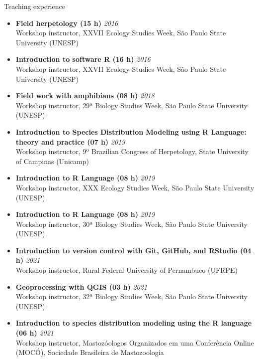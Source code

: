 \documentclass{resume}
\begin{document}
\begin{rSection}{Teaching experience}
\begin{itemize}
\item \textbf{Field herpetology (15 h)} \hfill{\em 2016}\\
Workshop instructor, XXVII Ecology Studies Week, São Paulo State University (UNESP) 

\item \textbf{Introduction to software R (16 h)} \hfill{\em 2016}\\
Workshop instructor, XXVII Ecology Studies Week, São Paulo State University (UNESP) 

\item \textbf{Field work with amphibians (08 h)} \hfill{\em 2018}\\
Workshop instructor, 29ª Biology Studies Week, São Paulo State University (UNESP) 

\item \textbf{Introduction to Species Distribution Modeling using R Language: theory and practice (07 h)} \hfill{\em 2019}\\
Workshop instructor, 9º Brazilian Congress of Herpetology, State University of Campinas (Unicamp)

\item \textbf{Introduction to R Language (08 h)} \hfill{\em 2019}\\
Workshop instructor, XXX Ecology Studies Week, São Paulo State University (UNESP) 

\item \textbf{Introduction to R Language (08 h)} \hfill{\em 2019}\\
Workshop instructor, 30ª Biology Studies Week, São Paulo State University (UNESP)

\item \textbf{Introduction to version control with Git, GitHub, and RStudio (04 h)} \hfill{\em 2021}\\
Workshop instructor, Rural Federal University of Pernambuco (UFRPE)

\item \textbf{Geoprocessing with QGIS (03 h)} \hfill{\em 2021}\\
Workshop instructor, 32ª Biology Studies Week, São Paulo State University (UNESP)

\item \textbf{Introduction to species distribution modeling using the R language (06 h)} \hfill{\em 2021}\\
Workshop instructor, Mastozóologos Organizados em uma Conferência Online (MOCÓ), Sociedade Brasileira de Mastozoologia


\end{itemize}
\end{rSection}
\end{document}
